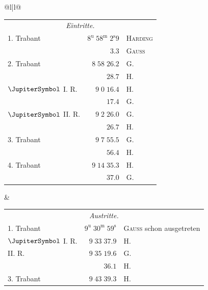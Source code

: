 \begin{center}\fontsize{8.8}{11}\selectfont\setlength{\tabcolsep}{3pt}\renewcommand{\arraystretch}{1.13}
\begin{tabular}{@{}l|l@{}}
\begin{tabular}[t]{@{}lrl@{}}
\multicolumn{3}{c}{\emph{Eintritte.}}\\
1. Trabant & $8^{\text{u}}\;58^{\text{m}}\;2^{\text{s}}9$ & \textsc{Harding}\\
 & $3.3$ & \textsc{Gauss}\\
2. Trabant & $8\;58\;26.2$ & G.\\
 & $28.7$ & H.\\
$\JupiterSymbol$ I. R. & $9\;0\;16.4$ & H.\\
 & $17.4$ & G.\\
$\JupiterSymbol$ II. R. & $9\;2\;26.0$ & G.\\
 & $26.7$ & H.\\
3. Trabant & $9\;7\;55.5$ & G.\\
 & $56.4$ & H.\\
4. Trabant & $9\;14\;35.3$ & H.\\
 & $37.0$ & G.\\
\end{tabular}
&
\begin{tabular}[t]{@{}lrl@{}}
\multicolumn{3}{c}{\emph{Austritte.}}\\
1. Trabant & $9^{\text{u}}\;30^{\text{m}}\;59^{\text{s}}$ & \textsc{Gauss} schon ausgetreten\\
$\JupiterSymbol$ I. R. & $9\;33\;37.9$ & H.\\
II. R. & $9\;35\;19.6$ & G.\\
 & $36.1$ & H.\\
3. Trabant & $9\;43\;39.3$ & H.\\
\end{tabular}
\end{tabular}\end{center}

